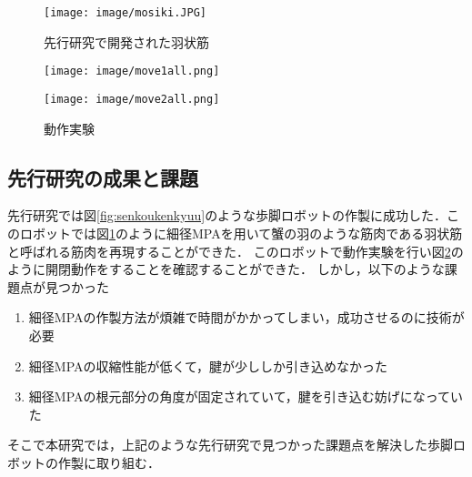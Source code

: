 \begin{figure}[t]
  \centering
  \vspace{3mm}
  \texttt{[image: image/mosiki.JPG]}
  \caption{先行研究で開発された羽状筋\cite{hasegawa}}
  \label{fig:ujyoukin}
\end{figure}
\begin{figure}[tbp]
  \begin{minipage}{1\hsize}
    \centering
    \texttt{[image: image/move1all.png]}
    \label{fig:move1}
  \end{minipage}
  \begin{minipage}{1\hsize}
    \centering
    \texttt{[image: image/move2all.png]}
    \label{fig:move2}
  \end{minipage}
%
  \caption{動作実験}
  \label{fig:movea12}
\end{figure}
%
\subsection{先行研究の成果と課題}
先行研究では図\ref{fig:senkoukenkyuu}\cite{hasegawa}のような歩脚ロボットの作製に成功した．このロボットでは図\ref{fig:ujyoukin}のように細径MPAを用いて蟹の羽のような筋肉である羽状筋と呼ばれる筋肉を再現することができた\cite{hasegawa}．
このロボットで動作実験を行い図\ref{fig:movea12}のように開閉動作をすることを確認することができた．
しかし，以下のような課題点が見つかった\cite{hasegawa}
\begin{enumerate}
  \item 細径MPAの作製方法が煩雑で時間がかかってしまい，成功させるのに技術が必要
  \item 細径MPAの収縮性能が低くて，腱が少ししか引き込めなかった
  \item 細径MPAの根元部分の角度が固定されていて，腱を引き込む妨げになっていた
\end{enumerate}
そこで本研究では，上記のような先行研究で見つかった課題点を解決した歩脚ロボットの作製に取り組む．
